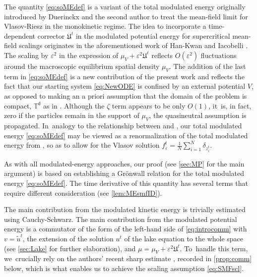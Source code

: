 \documentclass[JEP,XML,SOM,Unicode,published]{cedram}
\theoremstyle{plain}
\theoremstyle{definition}
\newcommand{\T}{{\mathbb{T}}}
\let\vep\varepsilon
\let\tl\tilde
\newcommand{\Uu}{\mathfrak{U}}
\renewcommand{\d}{\mathsf{d}}
\begin{document}
The quantity \eqref{eq:soMEdef} is a variant of the total modulated energy originally introduced by Duerinckx and the second author \cite[App.]{Serfaty2020} to treat the mean-field limit for Vlasov-Riesz in the monokinetic regime. The idea to incorporate a time-dependent corrector $\Uu^t$ in the modulated potential energy for supercritical mean-field scalings originates in the aforementioned work of Han-Kwan and Iacobelli \cite{HkI2021}. The scaling by $\vep^2$ in the expression of $\mu_V+\vep^2\Uu^t$ reflects $O(\vep^2)$ fluctuations around the macroscopic equilibrium spatial density $\mu_V$. The addition of the last term in \eqref{eq:soMEdef} is a new contribution of the present work and reflects the fact that our starting system \eqref{eq:NewODE} is confined by an external potential $V$, as opposed to making an a priori assumption that the domain of the problem is compact, \eg $\T^\d$ as in \cite{HkI2021, Rosenzweig2021ne}. Although the $\zeta$ term appears to be only $O(1)$, it~is, in fact, zero if the particles remain in the support of $\mu_V$, \ie the quasineutral assumption is propagated. In~analogy to the relationship between \cite{HkI2021} and \cite{Brenier2000}, our total modulated energy \eqref{eq:soMEdef} may be viewed as a renormalization of the total modulated energy from \cite{BCGM2015}, so as to allow for the Vlasov solution $f_\vep^t = \frac1N\sum_{i=1}^N \delta_{z_i^t}$.

As with all modulated-energy approaches, our proof (see \cref{sec:MP} for the main argument) is based on establishing a Grönwall relation for the total modulated energy \eqref{eq:soMEdef}. The time derivative of this quantity has several terms that require different consideration (see \cref{lem:MEsmfID}).

The main contribution from the modulated kinetic energy is trivially estimated using Cauchy-Schwarz. The main contribution from the modulated potential energy is a commutator of the form of the left-hand side of \eqref{eq:introcomm} with $v=\tl{u}^t$, the extension of the solution $u^t$ of the lake equation to the whole space (see \cref{sec:Lake} for further elaboration), and $\mu=\mu_V+\vep^2\Uu^t$. To~handle this term, we~crucially rely on the authors' recent sharp estimate \cite[Th.\,1.1]{RS2022}, recorded in \cref{prop:comm} below, which is what enables us to achieve the scaling assumption \eqref{eq:SMFscl}.
\end{document}
